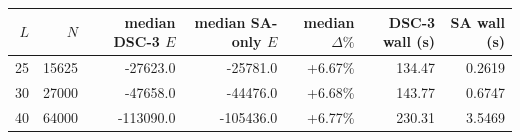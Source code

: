 \begin{tabular}{rrrrrrr}
\toprule
$L$ & $N$ & median DSC-3 $E$ & median SA-only $E$ & median $\Delta\%$ & DSC-3 wall (s) & SA wall (s) \\
\midrule
25 & 15625 & -27623.0 & -25781.0 & +6.67\% & 134.47 & 0.2619 \\
30 & 27000 & -47658.0 & -44476.0 & +6.68\% & 143.77 & 0.6747 \\
40 & 64000 & -113090.0 & -105436.0 & +6.77\% & 230.31 & 3.5469 \\
\bottomrule
\end{tabular}
